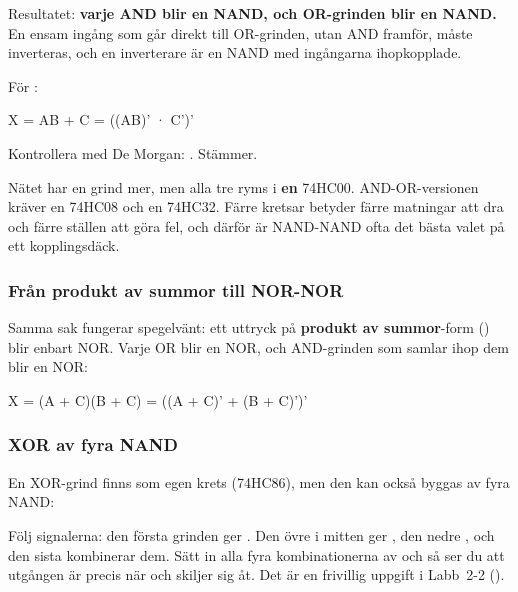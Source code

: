 Resultatet: \textbf{varje AND blir en NAND, och OR-grinden blir en NAND.} En ensam ingång som går
direkt till OR-grinden, utan AND framför, måste inverteras, och en inverterare är en NAND med
ingångarna ihopkopplade.

För :

\begin{textdrawing}
X = AB + C = ((AB)' · C')'
\end{textdrawing}

\noindent Kontrollera med De Morgan: . Stämmer.



\noindent Nätet har en grind mer, men alla tre ryms i \textbf{en} 74HC00. AND-OR-versionen kräver en
74HC08 och en 74HC32. Färre kretsar betyder färre matningar att dra och färre ställen att göra fel,
och därför är NAND-NAND ofta det bästa valet på ett kopplingsdäck.

\subsubsection{Från produkt av summor till NOR-NOR}
Samma sak fungerar spegelvänt: ett uttryck på \textbf{produkt av summor}-form ()
blir enbart NOR. Varje OR blir en NOR, och AND-grinden som samlar ihop dem blir en NOR:

\begin{console}
X = (A + C)(B + C) = ((A + C)' + (B + C)')'
\end{console}


\subsubsection{XOR av fyra NAND}
En XOR-grind finns som egen krets (74HC86), men den kan också byggas av fyra NAND:


\noindent Följ signalerna: den första grinden ger . Den övre i mitten ger
, den nedre , och den sista kombinerar dem. Sätt in alla fyra
kombinationerna av  och  så ser du att utgången är  precis när  och
 skiljer sig åt. Det är en frivillig uppgift i Labb~2-2 ().

